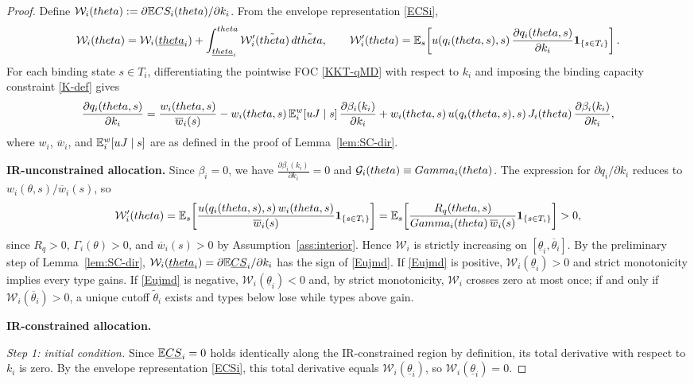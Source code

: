 \documentclass[master.tex]{subfiles}
\begin{document}
\begin{proof}
Define $\mathcal W_i(theta) := \partial \mathbb{E} CS_i(theta)/\partial k_i$. From the envelope representation \eqref{ECSi},
\[\mathcal W_i(theta) = \mathcal W_i(\underline{theta}_i) + \int_{\underline{theta}_i}^{theta}\mathcal W_i'(\tilde{theta})\,d\tilde{theta}, \qquad \mathcal W_i'(theta) = \mathbb{E}_s\!\left[u\!\left(q_i(theta,s),s\right)\frac{\partial q_i(theta,s)}{\partial k_i}\mathbf 1_{\{s\in T_i\}}\right].\]
For each binding state $s\in T_i$, differentiating the pointwise FOC \eqref{KKT-qMD} with respect to $k_i$ and imposing the binding capacity constraint \eqref{K-def} gives
\[\frac{\partial q_i(theta,s)}{\partial k_i} = \frac{w_i(theta,s)}{\overline w_i(s)} - w_i(theta,s)\,\mathsf {\mathbb{E}}_i^w[uJ\mid s]\,\frac{\partial \beta_i(k_i)}{\partial k_i} + w_i(theta,s)\,u\!\left(q_i(theta,s),s\right)J_i(theta)\,\frac{\partial \beta_i(k_i)}{\partial k_i},\]
where $w_i$, $\overline w_i$, and $\mathbb{E}_i^w[uJ\mid s]$ are as defined in the proof of Lemma~\ref{lem:SC-dir}.


\noindent\textbf{IR-unconstrained allocation.} Since $\beta_i = 0$, we have $\frac{\partial \beta_i(k_i)}{\partial k_i} = 0$ and $\mathcal{G}_i(theta)\equiv Gamma_i(theta)$. The expression for $\partial q_i/\partial k_i$ reduces to $w_i(\theta,s)/\overline w_i(s)$, so
\[\mathcal W_i'(theta) = \mathbb{E}_s\!\left[\frac{u(q_i(theta,s),s)\,w_i(theta,s)}{\overline w_i(s)}\mathbf 1_{\{s\in T_i\}}\right] = \mathbb{E}_s\!\left[\frac{R_q(theta,s)}{Gamma_i(theta)\,\overline w_i(s)}\mathbf 1_{\{s\in T_i\}}\right] > 0,\]
since $R_q > 0$, $\Gamma_i(\theta) > 0$, and $\overline w_i(s) > 0$ by Assumption~\ref{ass:interior}. Hence $\mathcal W_i$ is strictly increasing on $[\underline\theta_i,\overline\theta_i]$. By the preliminary step of Lemma~\ref{lem:SC-dir}, $\mathcal W_i(\underline{theta}_i) = \partial \mathbb{E}\underline{CS}_i/\partial k_i$ has the sign of \eqref{Eujmd}. If \eqref{Eujmd} is positive, $\mathcal W_i(\underline\theta_i)>0$ and strict monotonicity implies every type gains. If \eqref{Eujmd} is negative, $\mathcal W_i(\underline\theta_i)<0$ and, by strict monotonicity, $\mathcal W_i$ crosses zero at most once; if and only if $\mathcal W_i(\overline\theta_i)>0$, a unique cutoff $\tilde\theta_i$ exists and types below lose while types above gain.


\noindent\textbf{IR-constrained allocation.}

\noindent\textit{Step 1: initial condition.} Since $\mathbb{E}\underline{CS}_i = 0$ holds identically along the IR-constrained region by definition, its total derivative with respect to $k_i$ is zero. By the envelope representation \eqref{ECSi}, this total derivative equals $\mathcal W_i(\underline\theta_i)$, so $\mathcal W_i(\underline\theta_i) = 0$.


\end{proof}
\end{document}
